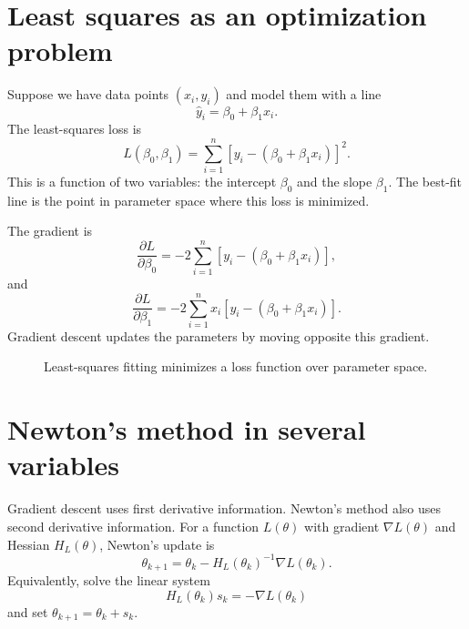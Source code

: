 \documentclass[11pt]{article}
\newcommand{\grad}{\nabla}
\begin{document}
\section{Least squares as an optimization problem}

Suppose we have data points $(x_i,y_i)$ and model them with a line
\[
\hat y_i=\beta_0+\beta_1x_i.
\]
The least-squares loss is
\[
L(\beta_0,\beta_1)=\sum_{i=1}^n \left[y_i-(\beta_0+\beta_1x_i)\right]^2.
\]
This is a function of two variables: the intercept $\beta_0$ and the slope $\beta_1$. The best-fit line is the point in parameter space where this loss is minimized.

The gradient is
\[
\frac{\partial L}{\partial \beta_0}=-2\sum_{i=1}^n \left[y_i-(\beta_0+\beta_1x_i)\right],
\]
and
\[
\frac{\partial L}{\partial \beta_1}=-2\sum_{i=1}^n x_i\left[y_i-(\beta_0+\beta_1x_i)\right].
\]
Gradient descent updates the parameters by moving opposite this gradient.

\begin{figure}[H]
\centering
{}
\caption{Least-squares fitting minimizes a loss function over parameter space.}
\end{figure}

\section{Newton's method in several variables}

Gradient descent uses first derivative information. Newton's method also uses second derivative information. For a function $L(\theta)$ with gradient $\grad L(\theta)$ and Hessian $H_L(\theta)$, Newton's update is
\[
\theta_{k+1}=\theta_k-H_L(\theta_k)^{-1}\grad L(\theta_k).
\]
Equivalently, solve the linear system
\[
H_L(\theta_k)s_k=-\grad L(\theta_k)
\]
and set $\theta_{k+1}=\theta_k+s_k$.
\end{document}
